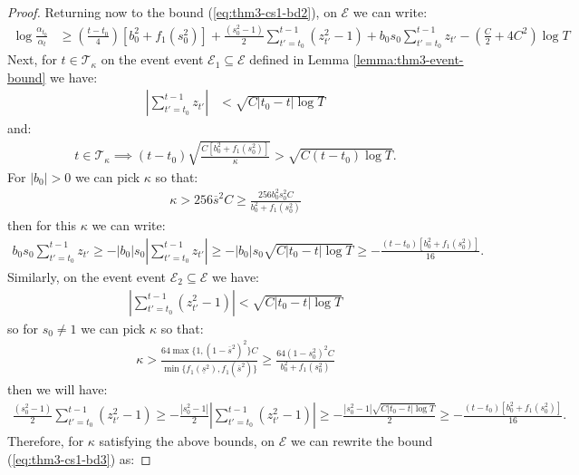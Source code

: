 \begin{proof}
Returning now to the bound (\ref{eq:thm3-cs1-bd2}), on $\mathcal{E}$ we can write:
\begin{align}
    \log \frac{\alpha_{t_0}}{\alpha_t} &\geq \left(\frac{t-t_0}{4}\right)\left[b_0^2 + f_1(s_0^2)\right] + \frac{(s_0^2-1)}{2} \sum_{t' = t_0}^{t - 1} (z_{t'}^2-1) + b_0 s_0 \sum_{t' = t_0}^{t - 1} z_{t'} - \left(\frac{C}{2} + 4C^2\right)\log T  \label{eq:thm3-cs1-bd3}
\end{align}
Next, for $t\in\mathcal{T}_\kappa$ on the event event $\mathcal{E}_1 \subseteq\mathcal{E}$ defined in Lemma \ref{lemma:thm3-event-bound} we have:
\begin{align*}
    \left|\sum_{t' = t_0}^{t - 1} z_{t'}\right| &< \sqrt{C|t_0 - t|\log T}
\end{align*}
and:
\begin{align*}
     t \in \mathcal{T}_{\kappa} \implies (t - t_0)\sqrt{\frac{C[b_0^2 + f_1(s_0^2)]}{\kappa}} > \sqrt{C (t - t_0)\log T}.
\end{align*}
For $|b_0| > 0$ we can pick $\kappa$ so that:
\begin{align*}
    \kappa >  256 \overline{s}^2 C \geq \frac{256 b_0^2s_0^2 C}{b_0^2 + f_1(s_0^2)}
\end{align*}
then for this $\kappa$ we can write:
\begin{align*}
    b_0s_0 \sum_{t' = t_0}^{t - 1} z_{t'} \geq - |b_0| s_0 \left|\sum_{t' = t_0}^{t - 1} z_{t'}\right| \geq - |b_0|s_0\sqrt{C|t_0 - t|\log T}  \geq - \frac{(t-t_0)[b_0^2 + f_1(s_0^2)]}{16}.
\end{align*}
Similarly, on the event event $\mathcal{E}_2 \subseteq \mathcal{E}$ we have:
\begin{align*}
     \left|\sum_{t' = t_0}^{t - 1} (z^2_{t'}-1)\right| <\sqrt{C|t_0 - t|\log T}
\end{align*}
so for $s_0\neq 1$ we can pick $\kappa$ so that:
\begin{align*}
    \kappa >  \frac{64 \max\{1,(1 -\overline{s}^2)^2\} C}{\min\{f_1(\underline{s}^2), f_1(\overline{s}^2)\}} \geq \frac{64 (1 -s_0^2)^2 C}{b_0^2 + f_1(s_0^2)}
\end{align*}
then we will have:
\small
\begin{align*}
      \frac{(s_0^2-1)}{2} \sum_{t' = t_0}^{t - 1} (z_{t'}^2-1) \geq -\frac{|s_0^2-1|}{2} \left|\sum_{t' = t_0}^{t - 1} (z_{t'}^2-1)\right| \geq -\frac{|s_0^2-1|\sqrt{C|t_0 - t|\log T}}{2} \geq - \frac{(t-t_0)[b_0^2 + f_1(s_0^2)]}{16}. 
\end{align*}
\normalsize
Therefore, for $\kappa$ satisfying the above bounds, on $\mathcal{E}$ we can rewrite the bound (\ref{eq:thm3-cs1-bd3}) as:

\end{proof}
